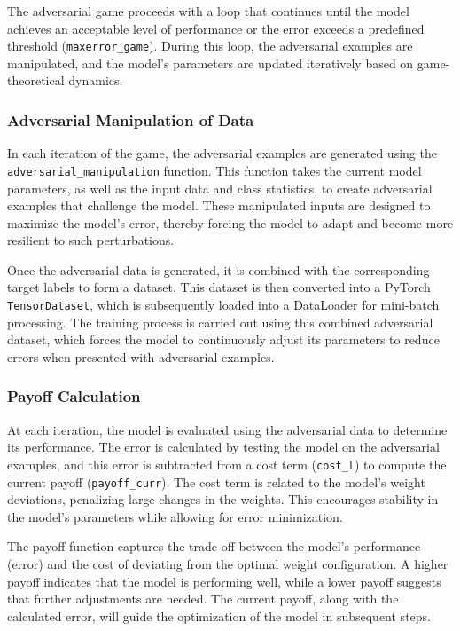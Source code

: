 \documentclass[9pt,a4paper,twoside]{rho-class/rho}
\begin{document}
The adversarial game proceeds with a loop that continues until the model achieves an acceptable level of performance or the error exceeds a predefined threshold (\texttt{maxerror\_game}). During this loop, the adversarial examples are manipulated, and the model's parameters are updated iteratively based on game-theoretical dynamics.

\subsubsection{Adversarial Manipulation of Data}
In each iteration of the game, the adversarial examples are generated using the \texttt{adversarial\_manipulation} function. This function takes the current model parameters, as well as the input data and class statistics, to create adversarial examples that challenge the model. These manipulated inputs are designed to maximize the model's error, thereby forcing the model to adapt and become more resilient to such perturbations.

Once the adversarial data is generated, it is combined with the corresponding target labels to form a dataset. This dataset is then converted into a PyTorch \texttt{TensorDataset}, which is subsequently loaded into a DataLoader for mini-batch processing. The training process is carried out using this combined adversarial dataset, which forces the model to continuously adjust its parameters to reduce errors when presented with adversarial examples.

\subsubsection{Payoff Calculation}
At each iteration, the model is evaluated using the adversarial data to determine its performance. The error is calculated by testing the model on the adversarial examples, and this error is subtracted from a cost term (\texttt{cost\_l}) to compute the current payoff (\texttt{payoff\_curr}). The cost term is related to the model's weight deviations, penalizing large changes in the weights. This encourages stability in the model's parameters while allowing for error minimization.

The payoff function captures the trade-off between the model's performance (error) and the cost of deviating from the optimal weight configuration. A higher payoff indicates that the model is performing well, while a lower payoff suggests that further adjustments are needed. The current payoff, along with the calculated error, will guide the optimization of the model in subsequent steps.
\end{document}
